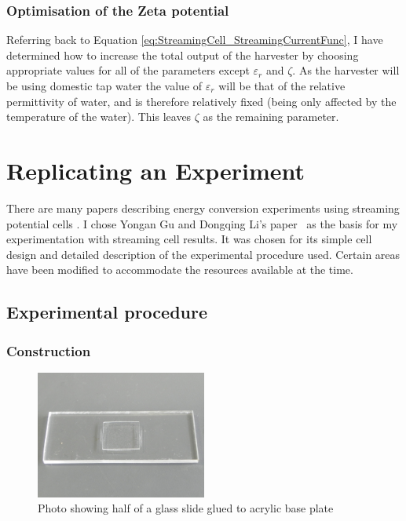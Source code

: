 \subsubsection*{Optimisation of the Zeta potential}

Referring back to Equation \ref{eq:StreamingCell_StreamingCurrentFunc}, I have
determined how to increase the total output of the harvester by choosing
appropriate values for all of the parameters except $\varepsilon_{r}$ and
$\zeta$. As the harvester will be using domestic tap water the value of
$\varepsilon_{r}$ will be that of the relative permittivity of water, and is
therefore relatively fixed (being only affected by the temperature of the
water). This leaves $\zeta$ as the remaining parameter.




\section{Replicating an Experiment}

There are many papers describing energy conversion experiments using streaming potential cells \cite{Gu2000,Mala1997,Scales1992,VanderHeyden2006}.
I chose Yongan Gu and Dongqing Li's paper~\cite{Gu2000} as the basis for my experimentation with streaming cell results.
It was chosen for its simple cell design and detailed description of the experimental procedure used.
Certain areas have been modified to accommodate the resources available at the time.


\subsection{\label{sub:Experimental-Procedure}Experimental procedure}


  \subsubsection*{Construction}

    \begin{figure}
      \centering
      \includegraphics[width=0.5\textwidth]{content/pt1/01-PowerHarvesting/graphics/Photo_streamingPotential_Assembly_Step1.JPG}
      \caption{\label{fig:Photo_streamingPotential_Assembly_Step1}Photo showing half of a glass slide glued to acrylic base plate}
    \end{figure}

